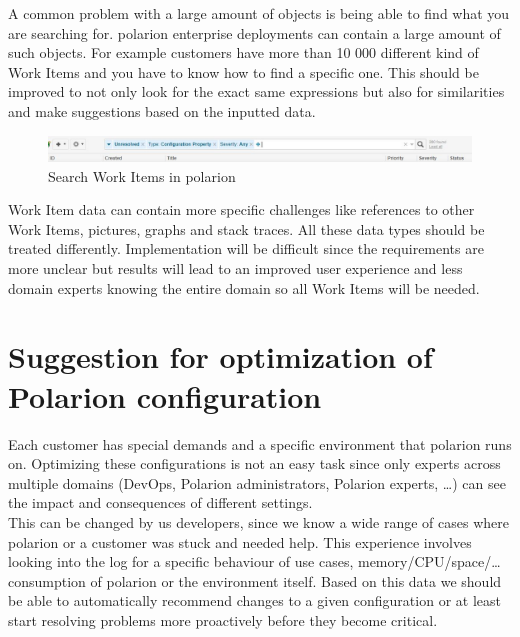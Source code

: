 \documentclass[thesis=M,english]{FITthesis}[2012/06/26]
\begin{document}
A common problem with a large amount of objects is being able to find what you are searching for. \acrshort{polarion} enterprise deployments can contain a large amount of such objects. For example customers have more than 10 000 different kind of Work Items and you have to know how to find a specific one. This should be improved to not only look for the exact same expressions but also for similarities and make suggestions based on the inputted data. 

\begin{figure}[h!]\centering
	\includegraphics[width=1\textwidth]{pictures/polarion_search}
	\caption{Search Work Items in \acrshort{polarion}}\label{fig:polarion_search}
\end{figure}

Work Item data can contain more specific challenges like references to other Work Items, pictures, graphs and stack traces. All these data types should be treated differently. Implementation will be difficult since the requirements are more unclear but results will lead to an improved user experience and less domain experts knowing the entire domain so all Work Items will be needed.

\section{Suggestion for optimization of Polarion configuration} 

Each customer has special demands and a specific environment that \acrshort{polarion} runs on. Optimizing these configurations is not an easy task since only experts across multiple domains (DevOps, Polarion administrators, Polarion experts, \dots) can see the impact and consequences of different settings. \\

This can be changed by us developers, since we know a wide range of cases where \acrfull{polarion} or a customer was stuck and needed help. This experience involves looking into the log for a specific behaviour of use cases, memory/CPU/space/\dots consumption of \acrshort{polarion} or the environment itself. Based on this data we should be able to automatically recommend changes to a given configuration or at least start resolving problems more proactively before they become critical.\\
\end{document}
